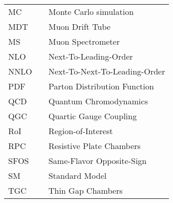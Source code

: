   \begin{tabular}{lp{}p{}}
    MC          & \dotfill & Monte Carlo simulation \\
    MDT         & \dotfill & Muon Drift Tube \\
    MS          & \dotfill & Muon Spectrometer \\
    NLO         & \dotfill & Next-To-Leading-Order \\
    NNLO         & \dotfill & Next-To-Next-To-Leading-Order \\
    PDF         & \dotfill & Parton Distribution Function \\
    QCD         & \dotfill & Quantum Chromodynamics \\
    QGC         & \dotfill & Quartic Gauge Coupling \\
    RoI         & \dotfill & Region-of-Interest \\
    RPC         & \dotfill & Resistive Plate Chambers \\
    SFOS        & \dotfill & Same-Flavor Opposite-Sign \\
    SM          & \dotfill & Standard Model  \\
    TGC         & \dotfill & Thin Gap Chambers \\

  \end{tabular}


